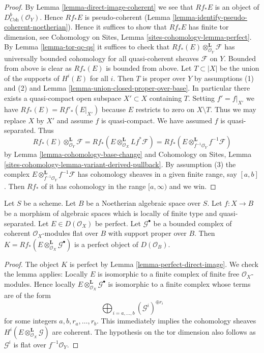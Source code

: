 \begin{proof}
By Lemma \ref{lemma-direct-image-coherent} we see that $Rf_*E$ is an object of
$D^b_{\textit{Coh}}(\mathcal{O}_Y)$. Hence $Rf_*E$ is pseudo-coherent
(Lemma \ref{lemma-identify-pseudo-coherent-noetherian}).
Hence it suffices to show that $Rf_*E$ has finite tor dimension, see
Cohomology on Sites, Lemma \ref{sites-cohomology-lemma-perfect}.
By Lemma \ref{lemma-tor-qc-qs} it suffices to check that
$Rf_*(E) \otimes_{\mathcal{O}_Y}^\mathbf{L} \mathcal{F}$
has universally bounded cohomology for all quasi-coherent
sheaves $\mathcal{F}$ on $Y$. Bounded from above is clear as $Rf_*(E)$
is bounded from above. Let $T \subset |X|$ be the union of the supports
of $H^i(E)$ for all $i$. Then $T$ is proper over $Y$ by assumptions (1)
and (2) and Lemma \ref{lemma-union-closed-proper-over-base}.
In particular there exists a quasi-compact open subspace
$X' \subset X$ containing $T$. Setting $f' = f|_{X'}$ we have
$Rf_*(E) = Rf'_*(E|_{X'})$ because $E$ restricts to zero on $X \setminus T$.
Thus we may replace $X$ by $X'$ and assume $f$ is quasi-compact.
We have assumed $f$ is quasi-separated. Thus
$$
Rf_*(E) \otimes_{\mathcal{O}_Y}^\mathbf{L} \mathcal{F} =
Rf_*\left(E \otimes_{\mathcal{O}_X}^\mathbf{L} Lf^*\mathcal{F}\right) =
Rf_*\left(E \otimes_{f^{-1}\mathcal{O}_Y}^\mathbf{L} f^{-1}\mathcal{F}\right)
$$
by
Lemma \ref{lemma-cohomology-base-change}
and
Cohomology on Sites, Lemma
\ref{sites-cohomology-lemma-variant-derived-pullback}.
By assumption (3) the complex
$E \otimes_{f^{-1}\mathcal{O}_Y}^\mathbf{L} f^{-1}\mathcal{F}$
has cohomology sheaves in a
given finite range, say $[a, b]$. Then $Rf_*$ of it
has cohomology in the range $[a, \infty)$ and we win.
\end{proof}

\begin{lemma}
\label{lemma-tensor-perfect}
Let $S$ be a scheme. Let $B$ be a Noetherian algebraic space over $S$.
Let $f : X \to B$ be a morphism of algebraic spaces which is locally of
finite type and quasi-separated. Let $E \in D(\mathcal{O}_X)$ be perfect.
Let $\mathcal{G}^\bullet$ be a bounded complex of coherent
$\mathcal{O}_X$-modules flat over $B$ with support proper over $B$. Then
$K = Rf_*(E \otimes^\mathbf{L}_{\mathcal{O}_X} \mathcal{G}^\bullet)$
is a perfect object of $D(\mathcal{O}_B)$.
\end{lemma}

\begin{proof}
The object $K$ is perfect by Lemma \ref{lemma-perfect-direct-image}.
We check the lemma applies: Locally $E$ is isomorphic to a finite complex
of finite free $\mathcal{O}_X$-modules. Hence locally
$E \otimes^\mathbf{L}_{\mathcal{O}_X} \mathcal{G}^\bullet$ is isomorphic
to a finite complex whose terms are of the form
$$
\bigoplus\nolimits_{i = a, \ldots, b} (\mathcal{G}^i)^{\oplus r_i}
$$
for some integers $a, b, r_a, \ldots, r_b$. This immediately implies the
cohomology sheaves $H^i(E \otimes^\mathbf{L}_{\mathcal{O}_X} \mathcal{G})$
are coherent. The hypothesis on the tor dimension also follows as
$\mathcal{G}^i$ is flat over $f^{-1}\mathcal{O}_Y$.
\end{proof}

